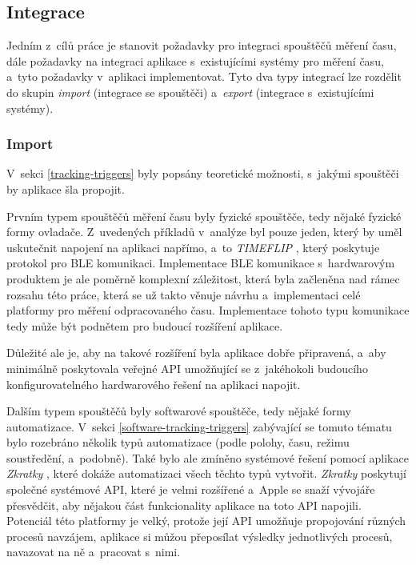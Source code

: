 \subsection{Integrace}\label{feature-integration}

Jedním z~cílů práce je stanovit požadavky pro integraci spouštěčů měření času, dále požadavky na integraci aplikace s~existujícími systémy pro měření času, a~tyto požadavky v~aplikaci implementovat. Tyto dva typy integrací lze rozdělit do skupin \emph{import} (integrace se spouštěči) a~\emph{export} (integrace s~existujícími systémy).

\subsubsection{Import}\label{feature-integration-import}

V~sekci \ref{tracking-triggers} byly popsány teoretické možnosti, s~jakými spouštěči by aplikace šla propojit.

Prvním typem spouštěčů měření času byly fyzické spouštěče, tedy nějaké fyzické formy ovladače. Z~uvedených příkladů v~analýze byl pouze jeden, který by uměl uskutečnit napojení na aplikaci napřímo, a~to \emph{TIMEFLIP} \cite{timeflip}, který poskytuje protokol pro BLE komunikaci. Implementace BLE komunikace s~hardwarovým produktem je ale poměrně komplexní záležitost, která byla začleněna nad rámec rozsahu této práce, která se už takto věnuje návrhu a~implementaci celé platformy pro měření odpracovaného času. Implementace tohoto typu komunikace tedy může být podnětem pro budoucí rozšíření aplikace.

Důležité ale je, aby na takové rozšíření byla aplikace dobře připravená, a~aby minimálně poskytovala veřejné API umožňující se z~jakéhokoli budoucího konfigurovatelného hardwarového řešení na aplikaci napojit.

Dalším typem spouštěčů byly softwarové spouštěče, tedy nějaké formy automatizace. V~sekci \ref{software-tracking-triggers} zabývající se tomuto tématu bylo rozebráno několik typů automatizace (podle polohy, času, režimu soustředění, a~podobně). Také bylo ale zmíněno systémové řešení pomocí aplikace \emph{Zkratky} \cite{ios-shortcuts-app}, které dokáže automatizaci všech těchto typů vytvořit. \emph{Zkratky} poskytují společné systémové API, které je velmi rozšířené a~Apple se snaží vývojáře přesvědčit, aby nějakou část funkcionality aplikace na toto API napojili. Potenciál této platformy je velký, protože její API umožňuje propojování různých procesů navzájem, aplikace si můžou přeposílat výsledky jednotlivých procesů, navazovat na ně a~pracovat s~nimi. 

